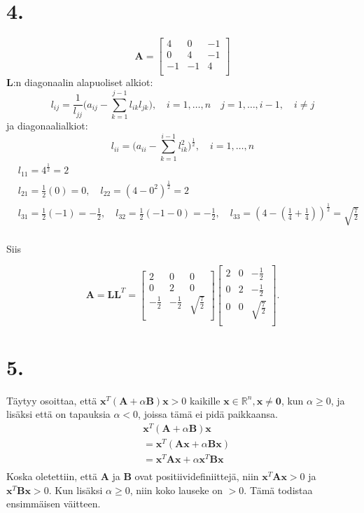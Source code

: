 \documentclass{article}
\begin{document}
\section*{4.}

\[
  \mathbf{A} = \begin{bmatrix}
    4 & 0 & -1 \\
    0 & 4 & -1 \\
    -1 & -1 & 4 \\
  \end{bmatrix}
\]
$\mathbf{L}$:n diagonaalin alapuoliset alkiot:
\[
  l_{ij} = \frac{1}{l_{jj}}\Big(a_{ij} - \sum_{k=1}^{j-1}l_{ik}l_{jk}\Big),
  \quad i = 1,\dots,n \quad j = 1,\dots, i-1, \quad i \neq j
\]
ja diagonaalialkiot:
\[
  l_{ii} = \Big(a_{ii} - \sum_{k=1}^{i-1}l_{ik}^2\Big)^{\frac{1}{2}},
  \quad i = 1,\dots,n
\]
\begin{align*}
  &l_{11} = 4^{\frac{1}{2}} = 2 \\
  &l_{21} = \frac{1}{2}(0) = 0, \quad l_{22} = (4 - 0^2)^{\frac{1}{2}} = 2 \\
  &l_{31} = \frac{1}{2}(-1) = -\frac{1}{2}, \quad l_{32} = \frac{1}{2}(-1 - 0) = -\frac{1}{2},
  \quad l_{33} = (4 - (\frac{1}{4} + \frac{1}{4}))^{\frac{1}{2}} = \sqrt{\frac{7}{2}} \\
\end{align*}

Siis

\[
  \mathbf{A} = \mathbf{LL}^T =
  \begin{bmatrix}
    2 & 0 & 0 \\
    0 & 2 & 0 \\
    -\frac{1}{2} & -\frac{1}{2} & \sqrt{\frac{7}{2}} \\
  \end{bmatrix}
  \begin{bmatrix}
    2 & 0 & -\frac{1}{2} \\
    0 & 2 & -\frac{1}{2} \\
    0 & 0 & \sqrt{\frac{7}{2}} \\
  \end{bmatrix}.
\]


\section*{5.}

Täytyy osoittaa, että $\mathbf{x}^T (\mathbf{A} + \alpha\mathbf{B})\mathbf{x} > 0$ kaikille
$\mathbf{x} \in \mathbb{R}^n, \mathbf{x} \neq \mathbf{0}$, kun $\alpha \geq 0$,
ja lisäksi että on tapauksia $\alpha < 0$, joissa tämä ei pidä paikkaansa.
\begin{align*}
  &\mathbf{x}^T(\mathbf{A} + \alpha\mathbf{B})\mathbf{x} \\
  &= \mathbf{x}^T(\mathbf{Ax} + \alpha\mathbf{Bx}) \\
  &= \mathbf{x}^T\mathbf{Ax} + \alpha\mathbf{x}^T\mathbf{Bx} \\
\end{align*}
Koska oletettiin, että $\mathbf{A}$ ja $\mathbf{B}$ ovat positiividefiniittejä,
niin $\mathbf{x}^T\mathbf{Ax} > 0$ ja $\mathbf{x}^T\mathbf{Bx} > 0$.
Kun lisäksi $\alpha \geq 0$, niin koko lauseke on $> 0$.
Tämä todistaa ensimmäisen väitteen.
\end{document}
